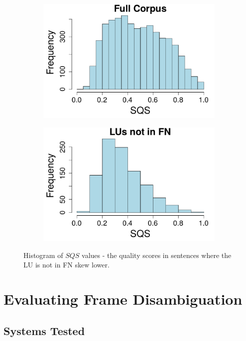 \begin{figure}[t!]
\begin{subfigure}{.25\textwidth}
\centering
\includegraphics[width=\linewidth]{img/sqs_full.pdf}
\end{subfigure}%
\begin{subfigure}{.25\textwidth}
\includegraphics[width=\linewidth]{img/sqs_notfn.pdf}
\end{subfigure}
\caption{Histogram of $SQS$ values - the quality scores in sentences where the LU is not in FN skew lower.}
\label{fig:sqs_histo}
\end{figure}


\section{Evaluating Frame Disambiguation}

\subsection{Systems Tested}

